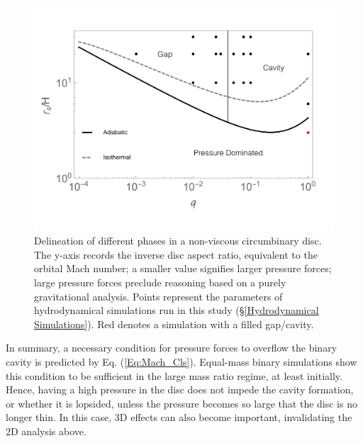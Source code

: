 \documentclass[usenatbib]{mnras}
\begin{document}
\begin{figure}
\begin{center}
\includegraphics[scale=0.25]{Gap_Closing_Mach_All.pdf} \vspace{-10 pt}
\end{center}
\caption{Delineation of different phases in a non-viscous circumbinary disc. The y-axis 
  records the inverse disc aspect ratio, equivalent to the orbital Mach number; a 
  smaller value signifies larger pressure forces; large pressure forces preclude 
  reasoning based on a purely gravitational analysis. Points
  represent the parameters of hydrodynamical simulations run in this study 
  (\S \ref{Hydrodynamical Simulations}). Red denotes a simulation with 
  a filled gap/cavity.}
\label{Fig:GapOpen}
\end{figure}

In summary, a necessary condition for pressure forces to overflow 
the binary cavity is predicted by Eq. (\ref{Eq:Mach_Cls}). Equal-mass binary 
simulations show this condition to be sufficient in the large 
mass ratio regime, at least initially. Hence, having a high pressure in 
the disc does not impede the cavity formation, or whether it is lopsided,
unless the pressure becomes so large that the disc is no longer thin. 
In this case, 3D effects can also become important, invalidating the 2D analysis above.
\end{document}
